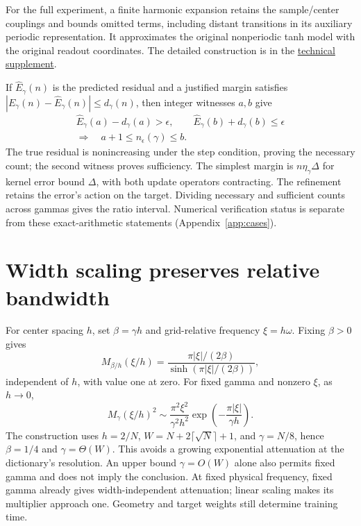 \documentclass[11pt]{article}
\newcommand{\repo}{https://github.com/samlayton99/precision-mlps/blob/experiment/frozen-gamma-probe}
\theoremstyle{definition}
\begin{document}
For the full experiment, a finite harmonic expansion retains the sample/center
couplings and bounds omitted terms, including distant transitions in its
auxiliary periodic representation. It approximates the original nonperiodic
tanh model with the original readout coordinates. The detailed construction
is in the \href{\repo/docs/gamma_factorized_readout.md}{technical supplement}.

If $\widehat E_\gamma(n)$ is the predicted residual and a justified margin
satisfies $|E_\gamma(n)-\widehat E_\gamma(n)|\le d_\gamma(n)$, then
integer witnesses $a,b$ give
\begin{equation}
\begin{gathered}
 \widehat E_\gamma(a)-d_\gamma(a)>\epsilon,\qquad
 \widehat E_\gamma(b)+d_\gamma(b)\le\epsilon\\[-2pt]
 \Longrightarrow\quad a+1\le n_\epsilon(\gamma)\le b.
\end{gathered}
\end{equation}
The true residual is nonincreasing under the step condition, proving the
necessary count; the second witness proves sufficiency. The simplest margin
is $n\eta_\gamma\Delta$ for kernel error bound $\Delta$, with both update
operators contracting. The refinement retains the error's action on the
target. Dividing necessary and sufficient counts across gammas gives the
ratio interval. Numerical verification status is separate from these
exact-arithmetic statements (Appendix~\ref{app:cases}).

\clearpage
\section{Width scaling preserves relative bandwidth}\label{app:width}
For center spacing $h$, set $\beta=\gamma h$ and grid-relative frequency
$\xi=h\omega$. Fixing $\beta>0$ gives
\begin{equation}
 M_{\beta/h}(\xi/h)=
 \frac{\pi|\xi|/(2\beta)}{\sinh(\pi|\xi|/(2\beta))},
\end{equation}
independent of $h$, with value one at zero. For fixed gamma and nonzero
$\xi$, as $h\to0$,
\begin{equation}
 M_\gamma(\xi/h)^2\sim\frac{\pi^2\xi^2}{\gamma^2h^2}
 \exp\!\left(-\frac{\pi|\xi|}{\gamma h}\right).
\end{equation}
The construction uses $h=2/N$, $W=N+2\lceil\sqrt N\rceil+1$, and
$\gamma=N/8$, hence $\beta=1/4$ and $\gamma=\Theta(W)$.
This avoids a growing exponential attenuation at the dictionary's resolution.
An upper bound $\gamma=O(W)$ alone also permits fixed gamma and does not
imply the conclusion. At fixed physical frequency, fixed gamma already
gives width-independent attenuation; linear scaling makes its multiplier
approach one. Geometry and target weights still determine training time.
\end{document}

